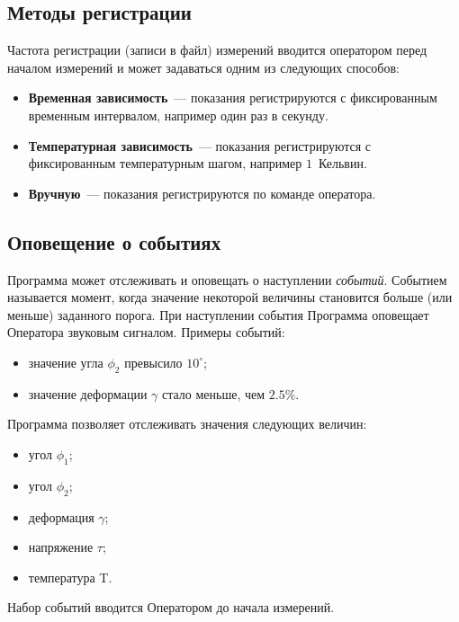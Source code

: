 \documentclass[12pt, a4paper, twocolumn]{book}
\begin{document}
\subsection{Методы регистрации}

\label{sec_registration_types}

Частота регистрации (записи в файл) измерений вводится оператором перед началом измерений и может задаваться одним из следующих способов:

\begin{itemize}
\item {\bf Временная зависимость}~--- показания регистрируются с фиксированным временным интервалом, например один раз в секунду.
\item {\bf Температурная зависимость}~--- показания регистрируются с фиксированным температурным шагом, например $1$~Кельвин.
\item \label{sec_reg_type_manual} {\bf Вручную}~--- показания регистрируются по команде оператора.
\end{itemize}

\subsection{Оповещение о событиях}
\label{sec_events}

Программа может отслеживать и оповещать о наступлении {\it событий}. Событием называется момент, когда значение некоторой величины становится больше (или меньше) заданного порога. При наступлении события Программа оповещает Оператора звуковым сигналом. Примеры событий:

\begin{itemize}
\item значение угла $\phi_2$ превысило $10^{\circ}$;
\item значение деформации $\gamma$ стало меньше, чем $2.5\%$.
\end{itemize}

Программа позволяет отслеживать значения следующих величин:

\begin{itemize}
\item угол $\phi_1$;
\item угол $\phi_2$;
\item деформация $\gamma$;
\item напряжение $\tau$;
\item температура T.
\end{itemize}

Набор событий вводится Оператором до начала измерений.
\end{document}
